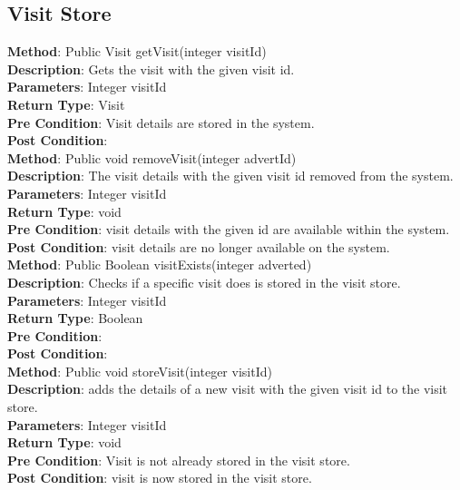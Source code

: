 \documentclass{l3deliverable}
\begin{document}
\subsection{Visit Store}

\textbf{Method}: Public Visit getVisit(integer visitId)\\
\textbf{Description}: Gets the visit with the given visit id. \\
\textbf{Parameters}: Integer visitId\\
\textbf{Return Type}: Visit\\
\textbf{Pre Condition}: Visit details are stored in the system.\\
\textbf{Post Condition}:\\

\textbf{Method}: Public void removeVisit(integer advertId)\\
\textbf{Description}: The visit details with the given visit id removed from the system. \\
\textbf{Parameters}: Integer visitId\\
\textbf{Return Type}: void\\
\textbf{Pre Condition}: visit details with the given id are available within the system.\\
\textbf{Post Condition}: visit details are no longer available on the system.\\

\textbf{Method}: Public Boolean visitExists(integer adverted)\\
\textbf{Description}: Checks if a specific visit does is stored in the visit store. \\
\textbf{Parameters}: Integer visitId\\
\textbf{Return Type}: Boolean\\
\textbf{Pre Condition}:\\
\textbf{Post Condition}:\\

\textbf{Method}: Public void storeVisit(integer visitId) \\
\textbf{Description}:  adds the details of a new visit with the given visit id to the visit store.\\
\textbf{Parameters}: Integer visitId\\
\textbf{Return Type}: void\\
\textbf{Pre Condition}: Visit is not already stored in the visit store.\\
\textbf{Post Condition}: visit is now stored in the visit store.\\
\end{document}
